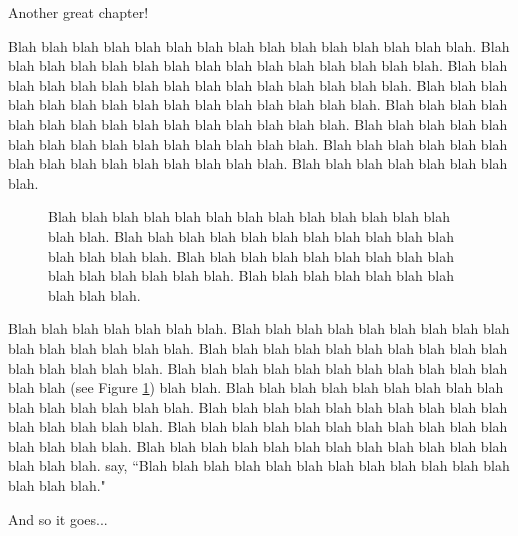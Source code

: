 Another great chapter!
\par
Blah blah blah blah blah blah blah blah blah blah blah blah blah blah blah. Blah blah blah blah blah blah blah blah blah blah blah blah blah blah blah. Blah blah blah blah blah blah blah blah blah blah blah blah blah blah blah. Blah blah blah blah blah blah blah blah blah blah blah blah blah blah blah. Blah blah blah blah blah blah blah blah blah blah blah blah blah blah blah. Blah blah blah blah blah blah blah blah blah blah blah blah blah blah blah.  Blah blah blah blah blah blah blah blah blah blah blah blah blah blah blah. Blah blah blah blah blah blah blah blah.
\begin{figure}[h!]
\begin{center}
\caption{Blah blah blah blah blah blah blah blah blah blah blah blah blah blah blah. Blah blah blah blah blah blah blah blah blah blah blah blah blah blah blah. Blah blah blah blah blah blah blah blah blah blah blah blah blah blah blah.  Blah blah blah blah blah blah blah blah blah blah.}
\label{Figure1}
\end{center}
\end{figure}
\par
Blah blah blah blah blah blah blah. Blah blah blah blah blah blah blah blah blah blah blah blah blah blah blah. \citep{Adams1978} Blah blah blah blah blah blah blah blah blah blah blah blah blah blah blah. Blah blah blah blah blah blah blah blah blah blah blah blah blah (see Figure \ref{Figure1}) blah blah. Blah blah blah blah blah blah blah blah blah blah blah blah blah blah blah. Blah blah blah blah blah blah blah blah blah blah blah blah blah blah blah. Blah blah blah blah blah blah blah blah blah blah blah blah blah blah blah. Blah blah blah blah blah blah blah blah blah blah blah blah blah blah blah. \citet{Adams1978} say, ``Blah blah blah blah blah blah blah blah blah blah blah blah blah blah blah." 
\par
And so it goes...